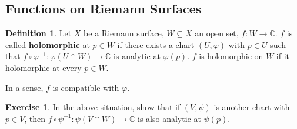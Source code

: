 \documentclass[12pt]{article}
\newcommand{\cx}{\mathbb{C}}
\newcommand\inv[1]{#1^{-1}}
\theoremstyle{definition}
\newtheorem{definition}[theorem]{Definition}
\newtheorem{exercise}{Exercise}
\theoremstyle{remark}
\begin{document}
\subsection{Functions on Riemann Surfaces}
\begin{definition}
    Let $X$ be a Riemann surface, $W\subseteq X$ an open set, $f:W\to\cx$. $f$ is called \textbf{holomorphic} at $p\in W$ if there exists a chart $(U,\varphi)$ with $p\in U$ such that $f\circ\inv{\varphi}:\varphi(U\cap W)\to\cx$ is analytic at $\varphi(p)$. $f$ is holomorphic on $W$ if it holomorphic at every $p\in W$.
\end{definition}
In a sense, $f$ is compatible with $\varphi$.
\begin{exercise}
    In the above situation, show that if $(V,\psi)$ is another chart with $p\in V$, then $f\circ\inv{\psi}:\psi(V\cap W)\to\cx$ is also analytic at $\psi(p)$.
\end{exercise}
\end{document}
